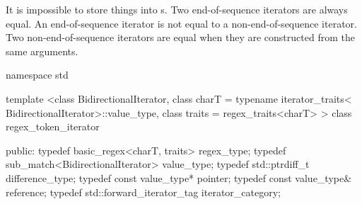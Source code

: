 \pnum
{}%
%
It is impossible to store things
into s. Two end-of-sequence iterators are always
equal. An end-of-sequence iterator is not equal to a
non-end-of-sequence iterator. Two non-end-of-sequence iterators are
equal when they are constructed from the same arguments.

\begin{codeblock}
namespace std {
  template <class BidirectionalIterator, 
            class charT = typename iterator_traits<
              BidirectionalIterator>::value_type,
              class traits = regex_traits<charT> >
  class regex_token_iterator  {
  public:
    typedef basic_regex<charT, traits>       regex_type;
    typedef sub_match<BidirectionalIterator> value_type;
    typedef std::ptrdiff_t                   difference_type;
    typedef const value_type*                pointer;
    typedef const value_type&                reference;
    typedef std::forward_iterator_tag        iterator_category;

}}
\end{codeblock}
